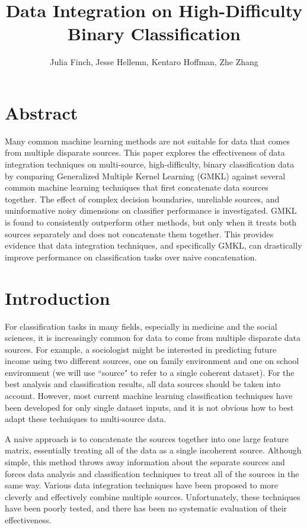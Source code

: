 \documentclass{article}
\begin{document}
\title{Data Integration on High-Difficulty Binary Classification}
\author{Julia Finch, Jesse Hellemn, Kentaro Hoffman, Zhe Zhang}
\maketitle


\section*{Abstract}

Many common machine learning methods are not suitable for data that comes from
multiple disparate sources. This paper explores the effectiveness of data
integration techniques on multi-source, high-difficulty, binary classification
data by comparing Generalized Multiple Kernel Learning (GMKL) against several
common machine learning techniques that first concatenate data sources
together. The effect of complex decision boundaries, unreliable sources, and
uninformative noisy dimensions on classifier performance is investigated. GMKL
is found to consistently outperform other methods, but only when it treats both
sources separately and does not concatenate them together. This provides
evidence that data integration techniques, and specifically GMKL, can
drastically improve performance on classification tasks over naive
concatenation.



\section*{Introduction}

For classification tasks in many fields, especially in medicine and the social
sciences, it is increasingly common for data to come from multiple disparate
data sources. For example, a sociologist might be interested in predicting
future income using two different sources, one on family environment and one on
school environment (we will use ``source" to refer to a single coherent
dataset). For the best analysis and classification results, all data sources
should be taken into account. However, most current machine learning
classification techniques have been developed for only single dataset inputs,
and it is not obvious how to best adapt these techniques to multi-source data.

A naive approach is to concatenate the sources together into one large feature
matrix, essentially treating all of the data as a single incoherent source.
Although simple, this method throws away information about the separate sources
and forces data analysis and classification techniques to treat all of the
sources in the same way. Various data integration techniques have been proposed
to more cleverly and effectively combine multiple sources. Unfortunately, these
techniques have been poorly tested, and there has been no systematic evaluation
of their effectiveness.
\end{document}
